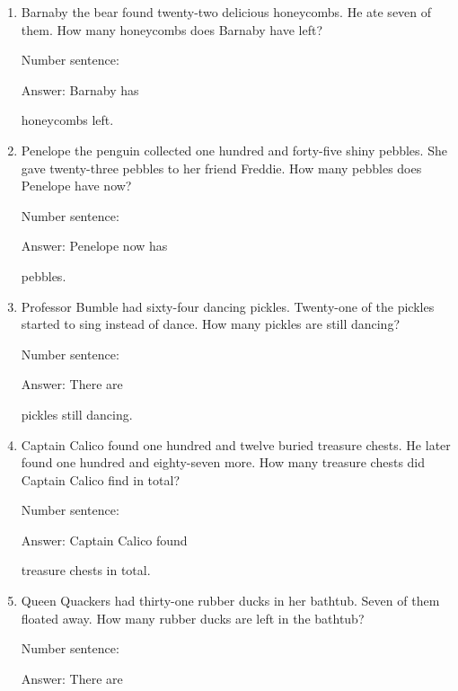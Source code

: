 \documentclass{tufte-book}
\begin{document}
\begin{enumerate}

\item
  Barnaby the bear found twenty-two delicious honeycombs. He ate seven
  of them. How many honeycombs does Barnaby have left?\medskip\par
  Number sentence:
  \dotfill\medskip\par
  Answer: Barnaby has
  \dotfill\medskip\par\mbox{}\dotfill\medskip\par\mbox{}\dotfill\bigskip
  honeycombs left.
\item
  Penelope the penguin collected one hundred and forty-five shiny
  pebbles. She gave twenty-three pebbles to her friend Freddie. How many
  pebbles does Penelope have now?\medskip\par
  Number sentence:
  \dotfill\medskip\par
  Answer: Penelope now has
  \dotfill\medskip\par\mbox{}\dotfill\medskip\par\mbox{}\dotfill\bigskip
  pebbles.
\item
  Professor Bumble had sixty-four dancing pickles. Twenty-one of the
  pickles started to sing instead of dance. How many pickles are still
  dancing?\medskip\par
  Number sentence:
  \dotfill\medskip\par
  Answer: There are
  \dotfill\medskip\par\mbox{}\dotfill\medskip\par\mbox{}\dotfill\bigskip
  pickles still dancing.
\item
  Captain Calico found one hundred and twelve buried treasure chests. He
  later found one hundred and eighty-seven more. How many treasure
  chests did Captain Calico find in total?\medskip\par
  Number sentence:
  \dotfill\medskip\par
  Answer: Captain Calico found
  \dotfill\medskip\par\mbox{}\dotfill\medskip\par\mbox{}\dotfill\bigskip
  treasure chests in total.
\item
  Queen Quackers had thirty-one rubber ducks in her bathtub. Seven of
  them floated away. How many rubber ducks are left in the bathtub?\medskip\par
  Number sentence:
  \dotfill\medskip\par
  Answer: There are
  \dotfill\medskip\par\mbox{}\dotfill\medskip\par\mbox{}\dotfill\bigskip

\end{enumerate}
\end{document}
